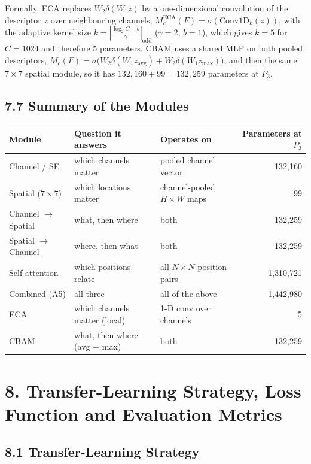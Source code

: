 \documentclass[11pt]{article}
\begin{document}
\medskip
Formally, ECA replaces $W_2\delta(W_1z)$ by a one-dimensional convolution
of the descriptor $z$ over neighbouring channels,
$M_c^{\mathrm{ECA}}(F)=\sigma(\mathrm{Conv1D}_k(z))$, with the adaptive
kernel size $k=\left|\frac{\log_2C+b}{\gamma}\right|_{\mathrm{odd}}$
($\gamma=2$, $b=1$), which gives $k=5$ for $C=1024$ and therefore 5
parameters. CBAM uses a shared MLP on both pooled descriptors,
$M_c(F)=\sigma\big(W_2\delta(W_1z_{\mathrm{avg}})+W_2\delta(W_1z_{\mathrm{max}})\big)$,
and then the same $7\times7$ spatial module, so it has
$132{,}160+99=132{,}259$ parameters at $P_3$.

\subsection*{7.7 Summary of the Modules}

\begin{center}
\small
\begin{tabular}{|l|l|l|r|}
\hline
Module & Question it answers & Operates on & Parameters at $P_3$\\
\hline
Channel / SE & which channels matter & pooled channel vector & 132{,}160\\
Spatial ($7\times7$) & which locations matter & channel-pooled $H\times W$ maps & 99\\
Channel $\rightarrow$ Spatial & what, then where & both & 132{,}259\\
Spatial $\rightarrow$ Channel & where, then what & both & 132{,}259\\
Self-attention & which positions relate & all $N\times N$ position pairs & 1{,}310{,}721\\
Combined (A5) & all three & all of the above & 1{,}442{,}980\\
ECA & which channels matter (local) & 1-D conv over channels & 5\\
CBAM & what, then where (avg + max) & both & 132{,}259\\
\hline
\end{tabular}
\end{center}


\section*{8. Transfer-Learning Strategy, Loss Function and Evaluation Metrics}

\subsection*{8.1 Transfer-Learning Strategy}
\end{document}

